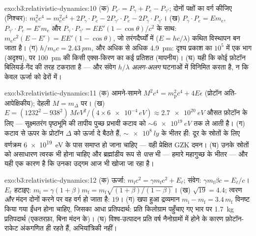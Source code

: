 \begin{solution}{exo:b3:relativistic-dynamics:10}
(क) $P_{e'} = P_\gamma + P_e - P_{\gamma'}$; दोनों पक्षों का वर्ग
कीजिए (निश्चर): $m_{\text{e}}^2c^4 = m_{\text{e}}^2c^4 + 2P_\gamma\!
\cdot\!P_e - 2P_{\gamma'}\!\cdot\!P_e - 2P_\gamma\!\cdot\!P_{\gamma'}$।
(ख) $P_\gamma\!\cdot\!P_e = E m_{\text{e}}$,
$P_{\gamma'}\!\cdot\!P_e = E'm_{\text{e}}$ और $P_\gamma\!\cdot\!
P_{\gamma'} = EE'(1 - \cos\theta)/c^2$ के साथ:
$m_{\text{e}}c^2(E - E') = EE'(1 - \cos\theta)$, जो तरंगदैर्घ्यों में
($E = hc/\lambda$) कथित विस्थापन बन जाता है। (ग) $h/m_{\text{e}}c =
\qty{2.43}{pm}$, और अधिक से अधिक \qty{4.9}{pm}: दृश्य प्रकाश का
$10^5$ में एक भाग (अदृश्य), पर \qty{100}{pm} की किसी एक्स-किरण का कई
प्रतिशत (मापनीय)। (घ) यही कि कोई फ़ोटॉन बिलियर्ड-गेंद की तरह टकराता है
--- और संवेग $h/\lambda$ \emph{अलग-अलग} घटनाओं में विनिमित करता है,
न कि केवल ऊर्जा को ढेरों में।
\end{solution}

\begin{solution}{exo:b3:relativistic-dynamics:11}
(क) आमने-सामने $M^2c^4 = m_{\text{p}}^2c^4 + 4E\epsilon$ (प्रोटॉन
अति-आपेक्षिकीय); देहली $M = m_\Delta$ पर। (ख) $E =
(1232^2 - 938^2)\,\unit{MeV^2}/(4 \times \num{6e-4}\,\unit{eV})
\approx \qty{2.7e20}{eV}$ औसत फ़ोटॉन के लिए --- सूक्ष्मतरंग पृष्ठभूमि
की तापीय पुच्छ प्रभावी कटाव को
$\sim\qty{6e19}{eV}$ तक ले आती है। (ग) कटाव से ऊपर के प्रोटॉन $\Delta$
को ऊर्जा दे बैठते हैं, $\sim\qty{e8}{ly}$ के भीतर ही: दूर के
स्रोतों के लिए वर्णक्रम \qty{6e19}{eV} के पास समाप्त हो जाना चाहिए ---
वही प्रेक्षित GZK दमन। (घ) उनके स्रोतों को असाधारण त्वरक भी होना
चाहिए और ब्रह्मांडीय रूप से \emph{पास} भी --- हमारे महागुच्छ के भीतर
--- और यही एक कारण है कि उनका उद्गम आज भी खोजा जा रहा है।
\end{solution}

\begin{solution}{exo:b3:relativistic-dynamics:12}
(क) ऊर्जा: $m_{\text{i}}c^2 = \gamma m_{\text{f}}c^2 + E_\ell$;
संवेग: $\gamma m_{\text{f}}\beta c = E_\ell/c$। $E_\ell$ हटाइए:
$m_{\text{i}} = \gamma(1 + \beta)m_{\text{f}} =
m_{\text{f}}\sqrt{(1+\beta)/(1-\beta)}$। (ख) $\sqrt{19} = 4.4$;
त्वरण \emph{और} मंदन दोनों करने पर वह वर्ग हो जाता है: $19$। (ग) खपा
हुआ द्रव्यमान $m_{\text{i}} - m_{\text{f}} = 3.4\,m_{\text{f}}$
विनष्ट किया गया ईंधन होना चाहिए, जिसका आधा प्रतिपदार्थ: प्रति किलोग्राम
पहुँचाए गए भार पर \qty{1.7}{kg} प्रतिपदार्थ (एकतरफ़ा, बिना मंदन के)।
(घ) विश्व-उत्पादन प्रति वर्ष नैनोग्रामों में होने के कारण फ़ोटॉन-राकेट
अंकगणित ही रहते हैं, अभियांत्रिकी नहीं।
\end{solution}

